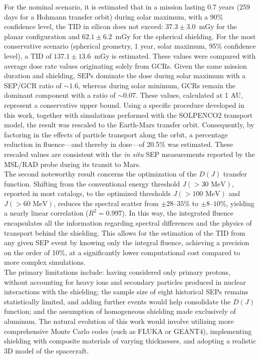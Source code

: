 \documentclass[a4paper,12pt]{article}
\begin{document}
For the nominal scenario, it is estimated that in a mission lasting 0.7 years (259 days for a Hohmann transfer orbit) during solar maximum, with a 90\% confidence level, the TID in silicon does not exceed: $37.3\pm3.0$~mGy for the planar configuration and $62.1\pm6.2$~mGy for the spherical shielding. For the most conservative scenario (spherical geometry, 1 year, solar maximum, 95\% confidence level), a TID of $137.1\pm13.6$~mGy is estimated. These values were compared with average dose rate values originating solely from GCRs. Given the same mission duration and shielding, SEPs dominate the dose during solar maximum with a SEP/GCR ratio of $\sim1.6$, whereas during solar minimum, GCRs remain the dominant component with a ratio of $\sim0.07$. These values, calculated at 1 AU, represent a conservative upper bound. Using a specific procedure developed in this work, together with simulations performed with the SOLPENCO2 transport model, the result was rescaled to the Earth-Mars transfer orbit. Consequently, by factoring in the effects of particle transport along the orbit, a percentage reduction in fluence—and thereby in dose—of 20.5\% was estimated. These rescaled values are consistent with the \textit{in situ} SEP measurements reported by the MSL/RAD probe during its transit to Mars.\\
The second noteworthy result concerns the optimization of the $D(J)$ transfer function. Shifting from the conventional energy threshold $J(>30\text{ MeV})$, reported in most catalogs, to the optimized thresholds $J(>100\text{ MeV})$ and $J(>60\text{ MeV})$, reduces the spectral scatter from $\pm28$--$35\%$ to $\pm8$--$10\%$, yielding a nearly linear correlation ($R^2 = 0.997$). In this way, the integrated fluence encapsulates all the information regarding spectral differences and the physics of transport behind the shielding. This allows for the estimation of the TID from any given SEP event by knowing only the integral fluence, achieving a precision on the order of 10\%, at a significantly lower computational cost compared to more complex simulations.\\
The primary limitations include: having considered only primary protons, without accounting for heavy ions and secondary particles produced in nuclear interactions with the shielding; the sample size of eight historical SEPs remains statistically limited, and adding further events would help consolidate the $D(J)$ function; and the assumption of homogeneous shielding made exclusively of aluminum. The natural evolution of this work would involve utilizing more comprehensive Monte Carlo codes (such as FLUKA or GEANT4), implementing shielding with composite materials of varying thicknesses, and adopting a realistic 3D model of the spacecraft.

\clearpage
\end{document}
